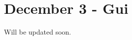 \chapter{December 3 -\/ Gui}
\hypertarget{md_updates_21__12__03}{}\label{md_updates_21__12__03}
\label{md_updates_21__12__03_autotoc_md1}%
%
 Will be updated soon. 